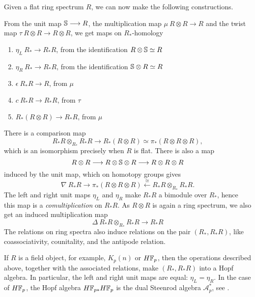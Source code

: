 Given a flat ring spectrum $R$, we can now make the following constructions. 

\begin{construction}
    \label{ch0:const:hopf-algebroid-maps-from-spectra}
    From the unit map $\S\longrightarrow R$, the multiplication map $\mu\: R\otimes R\longrightarrow R$ and the twist map $\tau\: R\otimes R\longrightarrow R\otimes R$, we get maps on $R_*$-homology
    \begin{enumerate}
        \item $\eta_L\: R_*\longrightarrow R_*R$, from the identification $R\otimes \S\simeq R$
        \item $\eta_R\: R_*\longrightarrow R_*R$, from the identification $\S\otimes R\simeq R$
        \item $\epsilon\: R_*R\longrightarrow R$, from $\mu$
        \item $c\: R_*R\longrightarrow R_*R$, from $\tau$
        \item $R_*(R\otimes R)\longrightarrow R_*R$, from $\mu$
    \end{enumerate}
    There is a comparison map
    \[R_*R\otimes_{R_*}R_*R\longrightarrow R_*(R\otimes R)\simeq \pi_*(R\otimes R\otimes R),\]
    which is an isomorphism precisely when $R$ is flat. There is also a map 
    \[R\otimes R \to R\otimes \S \otimes R \to R\otimes R\otimes R\]
    induced by the unit map, which on homotopy groups gives 
    \[\nabla\: R_*R \to \pi_*(R\otimes R\otimes R)\overset{\cong}\longleftarrow R_*R\otimes_{R_*}R_*R.\]
    The left and right unit maps $\eta_L$ and $\eta_R$ make $R_*R$ a bimodule over $R_*$, hence this map is a \emph{comultiplication} on $R_*R$. As $R\otimes R$ is again a ring spectrum, we also get an induced multiplication map  
    \[\Delta \: R_*R\otimes_{R_*}R_*R\longrightarrow R_*R\]
    The relations on ring spectra also induce relations on the pair $(R_*, R_*R)$, like coassociativity, counitality, and the antipode relation.   
\end{construction}

\begin{remark}
    \label{ch0:rm:fields-give-hopf-algebras}
    If $R$ is a field object, for example, $K_p(n)$ or $H\F_p$, then the operations described above, together with the associated relations, make $(R_*, R_*R)$ into a Hopf algebra. In particular, the left and right unit maps are equal: $\eta_L=\eta_R$. In the case of $H\F_p$, the Hopf algebra $H\F_{p*}H\F_p$ is the dual Steenrod algebra $\mathcal{A}^*_p$, see \cite{milnor_1958}. 
\end{remark}

